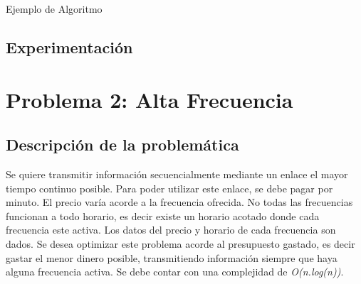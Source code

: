 \documentclass[a4paper]{article}
\begin{document}
\begin{algorithm}[h!]
\NoCaptionOfAlgo
\caption{Ejemplo de Algoritmo}
\end{algorithm}


\subsection{Experimentaci\'on}

\newpage

\section{Problema 2: Alta Frecuencia}
\subsection{Descripci\'on de la problem\'atica}

Se quiere transmitir informaci\'on secuencialmente mediante un enlace el mayor tiempo continuo posible. Para poder utilizar este enlace, se debe pagar por minuto. El precio var\'ia acorde a la frecuencia ofrecida. No todas las frecuencias funcionan a todo horario, es decir existe un horario acotado donde cada frecuencia este activa. Los datos del precio y horario de cada frecuencia son dados. Se desea optimizar este problema acorde al presupuesto gastado, es decir gastar el menor dinero posible, transmitiendo informaci\'on siempre que haya alguna frecuencia activa. Se debe contar con una complejidad de \textit{O(n.log(n))}.
\end{document}
